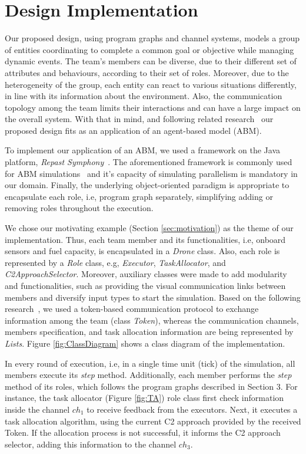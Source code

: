 \newpage
\section{Design Implementation}
\label{sec:design}

Our proposed design, using program graphs and channel systems, models a group of entities coordinating to complete a common goal or objective while managing dynamic events. The team's members can be diverse, due to their different set of attributes and behaviours, according to their set of roles. Moreover, due to the heterogeneity of the group, each entity can react to various situations differently, in line with its information about the environment. Also, the communication topology among the team limits their interactions and can have a large impact on the overall system. With that in mind, and following related research~\cite{evaluating} our proposed design fits as an application of an agent-based model (ABM). 

To implement our application of an ABM, we used a framework on the Java platform, \textit{Repast Symphony}~\cite{repastDoc}. The aforementioned framework is commonly used for ABM simulations~\cite{repast} and it's capacity of simulating parallelism is mandatory in our domain. Finally, the underlying object-oriented paradigm is appropriate to encapsulate each role, i.e, program graph separately, simplifying adding or removing roles throughout the execution.

We chose our motivating example (Section \ref{sec:motivation}) as the theme of our implementation. Thus, each team member and its functionalities, i.e, onboard sensors and fuel capacity, is encapsulated in a \textit{Drone} class. Also, each role is represented by a \textit{Role} class, e.g, \textit{Executor}, \textit{TaskAllocator}, and \textit{C2ApproachSelector}. Moreover, auxiliary classes were made to add modularity and functionalities, such as providing the visual communication links between members and diversify input types to start the simulation. Based on the following research~\cite{swarmGap}, we used a token-based communication protocol to exchange information among the team (class \textit{Token}), whereas the communication channels, members specification, and task allocation information are being represented by \textit{Lists}. Figure \ref{fig:ClassDiagram} shows a class diagram of the implementation.

In every round of execution, i.e, in a single time unit (tick) of the simulation, all members execute its \textit{step} method. Additionally, each member performs the \textit{step} method of its roles, which follows the program graphs described in Section 3. For instance, the task allocator (Figure \ref{fig:TA}) role class first check information inside the channel $ch_1$ to receive feedback from the executors. Next, it executes a task allocation algorithm, using the current C2 approach provided by the received Token. If the allocation process is not successful, it informs the C2 approach selector, adding this information to the channel $ch_3$.

